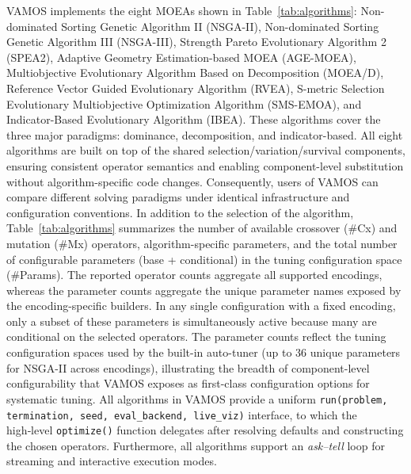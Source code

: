 \documentclass[final,5p,times,twocolumn]{elsarticle}
\begin{document}
VAMOS implements the eight MOEAs shown in Table~\ref{tab:algorithms}: Non-dominated Sorting Genetic Algorithm II (NSGA-II), Non-dominated Sorting Genetic Algorithm III (NSGA-III), Strength Pareto Evolutionary Algorithm 2 (SPEA2), Adaptive Geometry Estimation-based MOEA (AGE-MOEA), Multiobjective Evolutionary Algorithm Based on Decomposition (MOEA/D), Reference Vector Guided Evolutionary Algorithm (RVEA), S-metric Selection Evolutionary Multiobjective Optimization Algorithm (SMS-EMOA), and Indicator-Based Evolutionary Algorithm (IBEA). These algorithms cover the three major paradigms: dominance, decomposition, and indicator-based. All eight algorithms are built on top of the shared selection/variation/survival components, ensuring consistent operator semantics and enabling component-level substitution without algorithm-specific code changes. Consequently, users of VAMOS can compare different solving paradigms under identical infrastructure and configuration conventions. In addition to the selection of the algorithm, Table~\ref{tab:algorithms} summarizes the number of available crossover (\#Cx) and mutation (\#Mx) operators, algorithm-specific parameters, and the total number of configurable parameters (base + conditional) in the tuning configuration space (\#Params). The reported operator counts aggregate all supported encodings, whereas the parameter counts aggregate the unique parameter names exposed by the encoding-specific builders. In any single configuration with a fixed encoding, only a subset of these parameters is simultaneously active because many are conditional on the selected operators. The parameter counts reflect the tuning configuration spaces used by the built-in auto-tuner (up to 36 unique parameters for NSGA-II across encodings), illustrating the breadth of component-level configurability that VAMOS exposes as first-class configuration options for systematic tuning. All algorithms in VAMOS provide a uniform \texttt{run(problem, termination, seed, eval\_backend, live\_viz)} interface, to which the high‑level \texttt{optimize()} function delegates after resolving defaults and constructing the chosen operators. Furthermore, all algorithms support an \emph{ask–tell} loop for streaming and interactive execution modes.
\end{document}
